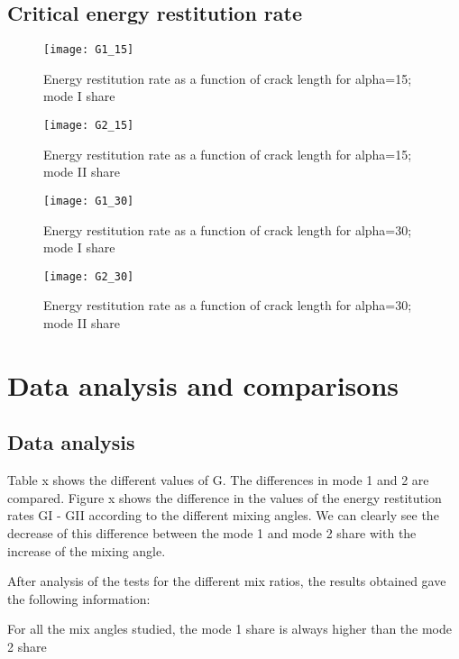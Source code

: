 \subsection{Critical energy restitution rate}

\begin{figure}[htp]
	\centering
	\texttt{[image: G1\_15]}
	\caption{Energy restitution rate as a function of crack length for alpha=15; mode I share}
	\label{fig:G1_15}
\end{figure}

\begin{figure}[htp]
	\centering
	\texttt{[image: G2\_15]}
	\caption{Energy restitution rate as a function of crack length for alpha=15; mode II share}
	\label{fig:G2_15}
\end{figure}

\begin{figure}[htp]
	\centering
	\texttt{[image: G1\_30]}
	\caption{Energy restitution rate as a function of crack length for alpha=30; mode I share}
	\label{fig:G1_30}
\end{figure}

\begin{figure}[htp]
	\centering
	\texttt{[image: G2\_30]}
	\caption{Energy restitution rate as a function of crack length for alpha=30; mode II share}
	\label{fig:G2_30}
\end{figure}

\section{Data analysis and comparisons}

\subsection{Data analysis}

Table x shows the different values of G. The differences in mode 1 and 2 are compared.
Figure x shows the difference in the values of the energy restitution rates GI - GII according to the different mixing angles. We can clearly see the decrease of this difference between the mode 1 and mode 2 share with the increase of the mixing angle.

After analysis of the tests for the different mix ratios, the results obtained gave the following information:

For all the mix angles studied, the mode 1 share is always higher than the mode 2 share

